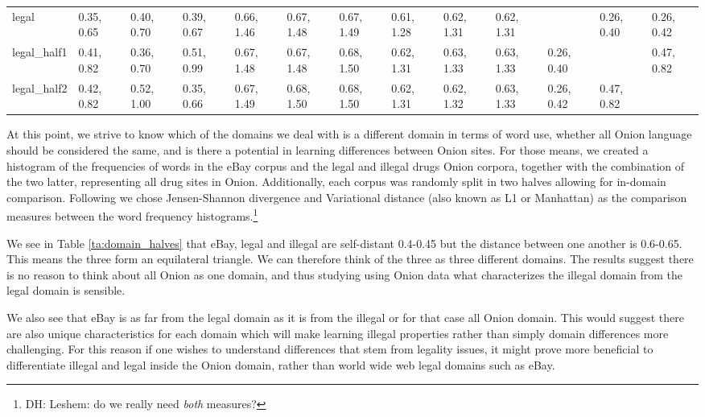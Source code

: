 \documentclass[11pt,a4paper,table]{article}
\newcommand{\daniel}[1]{\footnote{\color{brown}DH: #1}}
\begin{document}
\begin{table*}[]
{\begin{tabular}{@{}lllllllllllll@{}}
            legal            & 0.35, 0.65 & 0.40, 0.70       & 0.39, 0.67       & 0.66, 1.46 & 0.67, 1.48  & 0.67, 1.49  & 0.61, 1.28 & 0.62, 1.31     & 0.62, 1.31     &            & 0.26, 0.40   & 0.26, 0.42   \\
            legal\_half1     & 0.41, 0.82 & 0.36, 0.70       & 0.51, 0.99       & 0.67, 1.48 & 0.67, 1.48  & 0.68, 1.50  & 0.62, 1.31 & 0.63, 1.33     & 0.63, 1.33     & 0.26, 0.40 &              & 0.47, 0.82   \\
            legal\_half2     & 0.42, 0.82 & 0.52, 1.00       & 0.35, 0.66       & 0.67, 1.49 & 0.68, 1.50  & 0.68, 1.50  & 0.62, 1.31 & 0.62, 1.32     & 0.63, 1.33     & 0.26, 0.42 & 0.47, 0.82   &             
        \end{tabular}%
    }
    \caption{Jensen-Shannon divergence and Variational distance between word distribution in all Onion drug sites, legal and illegal Onion drug sites, and eBay sites.
    Each domain was also split in half for within-domain comparison. \label{ta:domain_halves}}
    
\end{table*}
At this point, we strive to know which of the domains we deal with is a different domain in terms of word use, whether all Onion language should be considered the same, and is there a potential in learning differences between Onion sites. For those means, we created a histogram of the frequencies of words in the eBay corpus and the legal and illegal drugs Onion corpora, together with the combination of the two latter, representing all drug sites in Onion. Additionally, each corpus was randomly split in two halves allowing for in-domain comparison. Following \citet{Plank2011EffectiveMO} we chose Jensen-Shannon divergence and Variational distance (also known as L1 or Manhattan) as the comparison measures between the word frequency histograms.\daniel{Leshem: do we really need \textit{both} measures?}

We see in Table \ref{ta:domain_halves} that eBay, legal and illegal are self-distant 0.4-0.45 but the distance between one another is 0.6-0.65. This means the three form an equilateral triangle. We can therefore think of the three as three different domains. The results suggest there is no reason to think about all Onion as one domain, and thus studying using Onion data what characterizes the illegal domain from the legal domain is sensible.

We also see that eBay is as far from the legal domain as it is from the illegal or for that case all Onion domain. This would suggest there are also unique characteristics for each domain which will make learning illegal properties rather than simply domain differences more challenging. For this reason if one wishes to understand differences that stem from legality issues, it might prove more beneficial to differentiate illegal and legal inside the Onion domain, rather than world wide web legal domains such as eBay.
\end{document}
